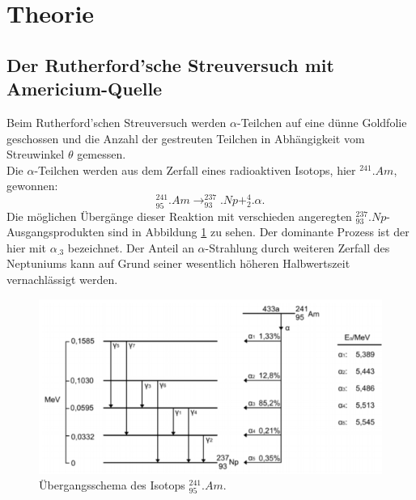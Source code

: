 \section{Theorie}
\label{sec:Theorie}

\subsection{Der Rutherford'sche Streuversuch mit Americium-Quelle}
Beim Rutherford'schen Streuversuch werden $\alpha$-Teilchen auf eine dünne Goldfolie geschossen und die Anzahl der gestreuten Teilchen in Abhängigkeit vom Streuwinkel $\theta$ gemessen.\\
Die $\alpha$-Teilchen werden aus dem Zerfall eines radioaktiven Isotops, hier $^{241}.{Am}$, gewonnen:
\[
^{241}_{95}.{Am}\rightarrow ^{237}_{93}.{Np} + ^{4}_{2}.{\alpha}\text{.}
\]
Die möglichen Übergänge dieser Reaktion mit verschieden angeregten $^{237}_{93}.{Np}$-Ausgangsprodukten sind in Abbildung \ref{fig:uebergang} zu sehen. Der dominante Prozess ist der hier mit $\alpha_.3$ bezeichnet. Der Anteil an $\alpha$-Strahlung durch weiteren Zerfall des Neptuniums kann auf Grund seiner wesentlich höheren Halbwertszeit vernachlässigt werden.\\
\begin{figure}
\centering
\includegraphics[width=\linewidth-60pt,keepaspectratio]{content/images/uebergang.pdf}
\caption{Übergangsschema des Isotops $^{241}_{95}.{Am}$.\cite{uebergang16}}
\label{fig:uebergang}
\end{figure}

